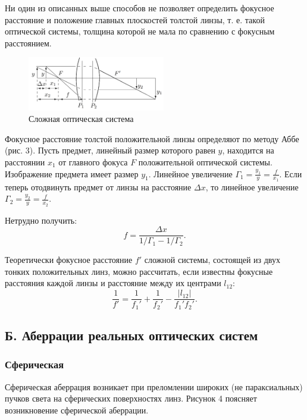 \documentclass[12pt,a4paper]{article}
\begin{document}
	Ни один из описанных выше способов не позволяет определить фокусное расстояние и положение главных плоскостей толстой линзы, т. е. такой оптической системы, толщина которой не мала по сравнению с фокусным расстоянием.
	
	\begin{figure}[h!]
		\centering
		\includegraphics[width=6cm]{res/hard.png}
		\caption{Сложная оптическая система}
	\end{figure}
	
	Фокусное расстояние толстой положительной линзы определяют по методу Аббе (рис. 3). Пусть предмет, линейный размер которого равен $y$, находится на расстоянии $x_1$ от главного фокуса $F$ положительной оптической системы. Изображение предмета имеет размер $y_1$. Линейное увеличение $\Gamma_1 = \frac{y_1}{y} = \frac{f}{x_1}$. Если теперь отодвинуть предмет от линзы на расстояние $\Delta x$, то линейное увеличение $\Gamma_2 = \frac{y_2}{y} = \frac{f}{x_2}$.
	
	Нетрудно получить:
	\begin{equation}
		f = \frac{\Delta x}{1/\Gamma_1 - 1/\Gamma_2}.
        \label{eq:5}
	\end{equation}

	Теоретически фокусное расстояние $f'$ сложной системы, состоящей из двух тонких положительных линз, можно рассчитать, если известны фокусные расстояния каждой линзы и расстояние между их центрами $l_{12}$:
	\begin{equation}
		\frac{1}{f'} = \frac{1}{f_1'} + \frac{1}{f_2'} - \frac{|l_{12}|}{f_1'f_2'}.
        \label{eq:6}
	\end{equation}

	\subsection*{Б. Аберрации реальных оптических систем}
	
	\subsubsection*{Сферическая}
	Сферическая аберрация возникает при преломлении широких (не параксиальных) пучков света на сферических поверхностях линз. Рисунок 4 поясняет возникновение сферической аберрации.
	
\end{document}
